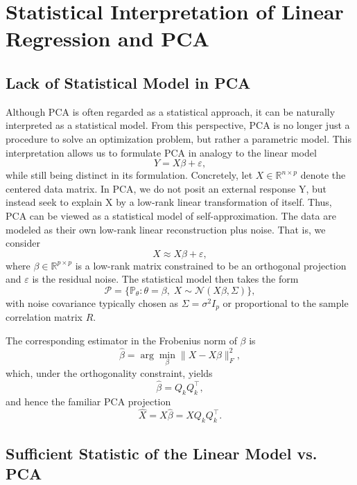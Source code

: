 \section{Statistical Interpretation of Linear Regression and PCA}


\subsection{Lack of Statistical Model in PCA}

Although PCA is often regarded as a statistical approach, it can be naturally interpreted as a statistical model. From this perspective, PCA is no longer just a procedure to solve an optimization problem, but rather a parametric model. This interpretation allows us to formulate PCA in analogy to the linear model
\[
Y = X \beta + \varepsilon,
\]
while still being distinct in its formulation. Concretely, let $X \in \mathbb{R}^{n \times p}$ denote the centered data matrix. In PCA, we do not posit an external response Y, but instead seek to explain X by a low-rank linear transformation of itself. Thus, PCA can be viewed as a statistical model of self-approximation. The data are modeled as their own low-rank linear reconstruction plus noise. That is, we consider
\[
X \approx X \beta + \varepsilon,
\]
where $\beta \in \mathbb{R}^{p \times p}$ is a low-rank matrix constrained to be an orthogonal projection and $\varepsilon$ is the residual noise. The statistical model then takes the form
\[
\mathcal{P} = \{ \mathbb{P}_\theta : \theta = \beta, \; X \sim \mathcal{N}(X \beta, \Sigma) \},
\]
with noise covariance typically chosen as $\Sigma = \sigma^2 I_p$ or proportional to the sample correlation matrix $R$.

The corresponding estimator in the Frobenius norm of $\beta$ is
\[
\hat{\beta} = \arg\min_{\beta} \| X - X \beta \|_F^2,
\]
which, under the orthogonality constraint, yields
\[
\hat{\beta} = Q_k Q_k^\top,
\]
and hence the familiar PCA projection
\[
\widehat{X} = X \hat{\beta} = X Q_k Q_k^\top.
\]

\subsection{Sufficient Statistic of the Linear Model vs. PCA}


